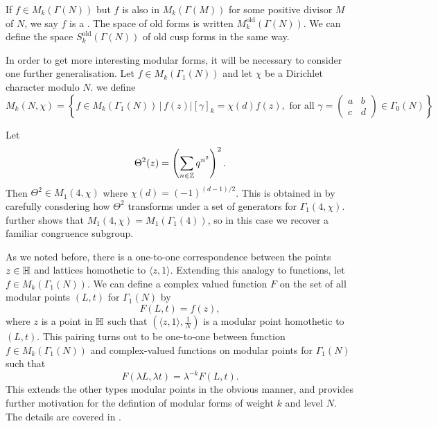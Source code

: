 \documentclass[12pt, a4paper]{amsart}
\begin{document}
\begin{defn}
  If $f \in M_k(\Gamma(N))$ but $f$ is also in $M_k(\Gamma(M))$ for some
  positive divisor $M$ of $N$, we say $f$ is a . The space of old forms is written
  $M_k^{\text{old}}(\Gamma(N)).$ We can define the space
  $S_k^{\text{old}}(\Gamma(N))$ of old cusp forms in the same way.  
\end{defn}

In order to get more interesting modular forms, it will be necessary to consider
one further generalisation. Let $f \in M_k(\Gamma_1(N))$ and let $\chi$ be a
Dirichlet character modulo $N$. we define
\[M_k(N, \chi) = \left\{ f \in M_k(\Gamma_1(N)) \, | \,
    f(z) | [\gamma]_k = \chi(d)f(z), \text{ for all } \gamma =
  \left(
    \begin{smallmatrix}
      a & b \\ c & d
    \end{smallmatrix}
\right) \in \Gamma_0(N) \right\}\]

\begin{example} \label{ex:theta}
  Let
  \[\Theta^2(z) = \left( \sum\limits_{n \in {\mathbb Z}} q^{n^2} \right)^2.\]
  Then $\Theta^2 \in M_1(4,\chi)$ where $\chi(d) = (-1)^{(d-1)/2}$.
  This is obtained in \cite[Proposition
  30]{koblitz} by carefully consdering how $\Theta^2$ transforms under a set of
  generators for $\Gamma_1(4, \chi)$. \cite[Proposition 28]{koblitz} further
  shows that $M_1(4, \chi) = M_1(\Gamma_1(4))$, so in this case we recover a
  familiar congruence subgroup.
\end{example}

As we noted before, there is a one-to-one correspondence
between the points $z\in \mathbb{H}$ and lattices homothetic to $\langle z, 1
\rangle$.
Extending this
analogy to functions, let $f \in M_k(\Gamma_1(N))$. We can define a complex
valued function
$F$ on the set of all modular points $(L,t)$ for $\Gamma_1(N)$ by
\[F(L,t) = f(z),\]
where $z$ is a point in $\mathbb{H}$ such that $(\langle z,1 \rangle, \frac{1}{N})$
is a modular point homothetic to $(L,t).$ This pairing turns out to be
one-to-one between function $f \in M_k(\Gamma_1(N))$ and complex-valued
functions on modular points for $\Gamma_1(N)$ such that
\[F(\lambda L, \lambda t) = \lambda^{-k} F(L, t).\]
This extends the other types modular points in the obvious manner, and
provides further motivation for the defintion of modular forms of weight
$k$ and level $N$. The details are covered in
\cite[Section III-5, Pages 153-155]{koblitz}.
\end{document}
